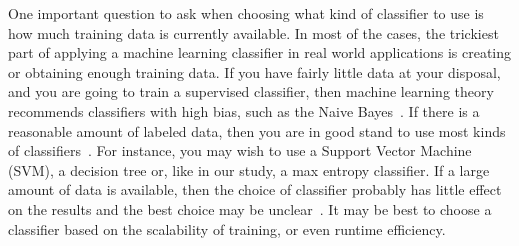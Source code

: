 One important question to ask when choosing what kind of classifier to use is how much training data is currently available. In most of the cases, the trickiest part of applying a machine learning classifier in real world applications is creating or obtaining enough training data. If you have fairly little data at your disposal, and you are going to train a supervised classifier, then machine learning theory recommends classifiers with high bias, such as the Naive Bayes~\cite{Forman2004PKDD,Ng2001NIPS}. If there is a reasonable amount of labeled data, then you are in good stand to use most kinds of classifiers~\cite{Manning2008book}. For instance, you may wish to use a Support Vector Machine (SVM), a decision tree or, like in our study, a max entropy classifier. If a large amount of data is available, then the choice of classifier probably has little effect on the results and the best choice may be unclear~\cite{Banko2001book}. It may be best to choose a classifier based on the scalability of training, or even runtime efficiency.

